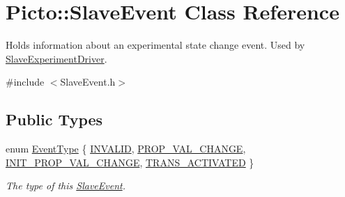 \hypertarget{class_picto_1_1_slave_event}{\section{Picto\-:\-:Slave\-Event Class Reference}
\label{class_picto_1_1_slave_event}
}


Holds information about an experimental state change event. Used by \hyperlink{class_picto_1_1_slave_experiment_driver}{Slave\-Experiment\-Driver}.  




{\ttfamily \#include $<$Slave\-Event.\-h$>$}

\subsection*{Public Types}
\begin{DoxyCompactItemize}
\item 
enum \hyperlink{class_picto_1_1_slave_event_a5e2557edef42f1cfd7ae98463166c4a4}{Event\-Type} \{ \hyperlink{class_picto_1_1_slave_event_a5e2557edef42f1cfd7ae98463166c4a4a493b424c41715d3713e4bd68658653f9}{I\-N\-V\-A\-L\-I\-D}, 
\hyperlink{class_picto_1_1_slave_event_a5e2557edef42f1cfd7ae98463166c4a4afb990fae9e3e7caac8287944c9f3e0a6}{P\-R\-O\-P\-\_\-\-V\-A\-L\-\_\-\-C\-H\-A\-N\-G\-E}, 
\hyperlink{class_picto_1_1_slave_event_a5e2557edef42f1cfd7ae98463166c4a4a77e5ce75f66238c8a3872a66ec7b7684}{I\-N\-I\-T\-\_\-\-P\-R\-O\-P\-\_\-\-V\-A\-L\-\_\-\-C\-H\-A\-N\-G\-E}, 
\hyperlink{class_picto_1_1_slave_event_a5e2557edef42f1cfd7ae98463166c4a4add958a7663c6ffb3d2ab4cfacf30d82b}{T\-R\-A\-N\-S\-\_\-\-A\-C\-T\-I\-V\-A\-T\-E\-D}
 \}
\begin{DoxyCompactList}\small\item\em The type of this \hyperlink{class_picto_1_1_slave_event}{Slave\-Event}. \end{DoxyCompactList}\end{DoxyCompactItemize}
